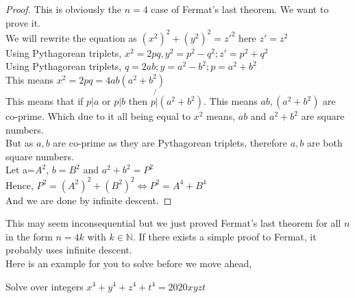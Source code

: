 \begin{proof}
    This is obviously the $n=4$ case of Fermat's last theorem. We want to prove it.\\
   We will rewrite the equation as $(x^2)^2+(y^2)^2={z'}^2$ here $z'=z^2$\\
   Using Pythagorean triplets,  $x^2=2pq, y^2=p^2-q^2; z'=p^2+q^2$\\
   Using Pythagorean triplets, $q=2ab; y=a^2-b^2; p=a^2+b^2$\\
   This means $x^2=2pq=4ab(a^2+b^2)$\\
   This means that if $p|a$ or $p|b$ then $p\not{|}(a^2+b^2)$. This means $ab, (a^2+b^2)$ are co-prime. Which due to it all being equal to $x^2$ means, $ab$ and $a^2+b^2$ are square numbers.\\
   But as $a,b$ are co-prime as they are Pythagorean triplets, therefore $a,b$ are both square numbers.\\
   Let a=$A^2$, $b=B^2$ and $a^2+b^2=P^2$\\
   Hence, $P^2=(A^2)^2+(B^2)^2 \iff P^2=A^4+B^4$\\
   And we are done by infinite descent.
\end{proof}
This may seem inconsequential but we just proved Fermat's last theorem for all $n$ in the form $n=4k$ with $k \in \mathbb{N}$.  If there exists a simple proof to Fermat, it probably uses infinite descent.\\
Here is an example for you to solve before we move ahead,\\
\begin{example}
    Solve over integers $x^4+y^4+z^4+t^4=2020xyzt$
\end{example}
